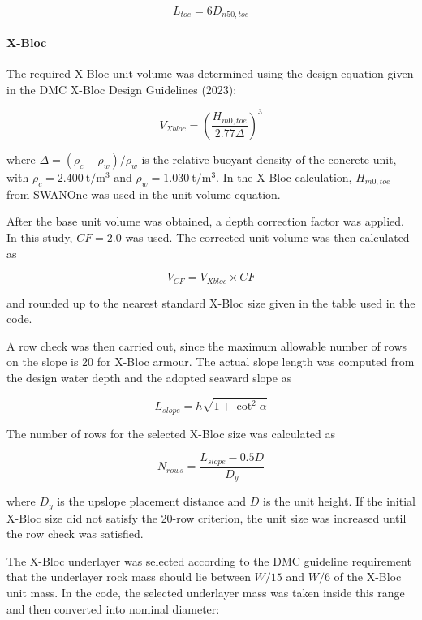 \documentclass[a4paper, 11pt]{article}
\newcommand{\subsubsubsection}[1]{\paragraph{#1}\mbox{}}
\begin{document}
\begin{equation}
    L_{toe}=6D_{n50,toe}
\end{equation}


\subsubsubsection{X-Bloc}

\hspace*{0.5cm} The required X-Bloc unit volume was determined using the design equation given in the DMC X-Bloc Design Guidelines (2023):

\begin{equation}
    V_{Xbloc}=
    \left(\frac{H_{m0,toe}}{2.77\Delta}\right)^3
\end{equation}

where \(\Delta=(\rho_c-\rho_w)/\rho_w\) is the relative buoyant density of the concrete unit, with \(\rho_c=2.400~\mathrm{t/m^3}\) and \(\rho_w=1.030~\mathrm{t/m^3}\). In the X-Bloc calculation, \(H_{m0,toe}\) from SWANOne was used in the unit volume equation.

After the base unit volume was obtained, a depth correction factor was applied. In this study, \(CF=2.0\) was used. The corrected unit volume was then calculated as

\begin{equation}
    V_{CF}=V_{Xbloc}\times CF
\end{equation}

and rounded up to the nearest standard X-Bloc size given in the table used in the code.

A row check was then carried out, since the maximum allowable number of rows on the slope is 20 for X-Bloc armour. The actual slope length was computed from the design water depth and the adopted seaward slope as

\begin{equation}
    L_{slope}=h\sqrt{1+\cot^2\alpha}
\end{equation}

The number of rows for the selected X-Bloc size was calculated as

\begin{equation}
    N_{rows}=
    \frac{L_{slope}-0.5D}{D_y}
\end{equation}

where \(D_y\) is the upslope placement distance and \(D\) is the unit height. If the initial X-Bloc size did not satisfy the 20-row criterion, the unit size was increased until the row check was satisfied.

The X-Bloc underlayer was selected according to the DMC guideline requirement that the underlayer rock mass should lie between \(W/15\) and \(W/6\) of the X-Bloc unit mass. In the code, the selected underlayer mass was taken inside this range and then converted into nominal diameter:
\end{document}
